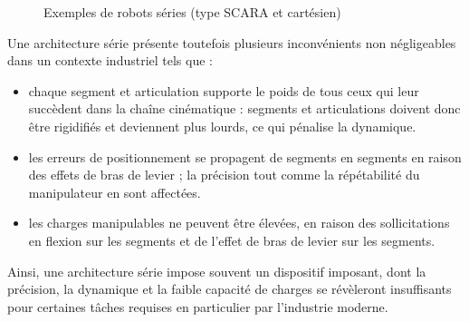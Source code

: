 \begin{figure}[!ht]
  \centering
\hfill
    \caption{\footnotesize{Exemples de robots séries (type SCARA et 
cart\'esien)}}
\label{intro:fig2}
\end{figure}

Une architecture série présente toutefois plusieurs inconvénients non 
négli\-gea\-bles dans un contexte industriel tels que :
\begin{itemize}
 \item chaque segment et articulation supporte le poids de tous ceux qui leur 
succèdent dans la chaîne cinématique : segments et articulations doivent donc 
être rigidifiés et deviennent plus lourds, ce qui pénalise la dynamique.
 \item les erreurs de positionnement se propagent de segments en segments en 
raison des effets de bras de levier ; la précision tout comme la répétabilité du 
manipulateur en sont affectées.
 \item les charges manipulables ne peuvent être \'elev\'ees, en raison des 
sollicitations en flexion sur les segments et de l'effet de bras de levier sur 
les segments.
\end{itemize}

Ainsi, une architecture série impose souvent un dispositif imposant, dont la 
précision, la dynamique et la faible capacité de charges se révèleront 
insuffisants pour certaines tâches requises en particulier par l'industrie 
moderne.

